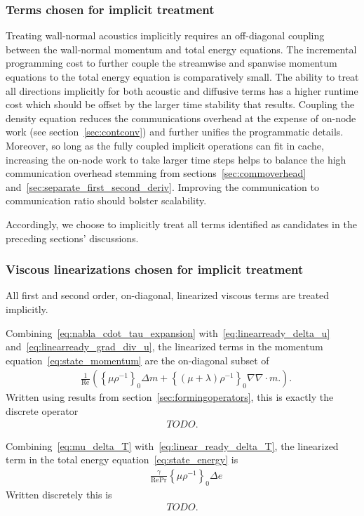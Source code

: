 \documentclass[letterpaper,11pt,nointlimits,reqno,draft]{amsart}
\newcommand{\Reynolds}[1][]{\ensuremath{\mbox{Re}_{#1}}}
\newcommand{\Prandtl}[1][]{\ensuremath{\mbox{Pr}_{#1}}}
\newcommand{\reference}[1]{\ensuremath{\left\{#1\right\}_{0}}}
\begin{document}
\subsubsection{Terms chosen for implicit treatment}

Treating wall-normal acoustics implicitly requires an off-diagonal coupling
between the wall-normal momentum and total energy equations.  The incremental
programming cost to further couple the streamwise and spanwise momentum
equations to the total energy equation is comparatively small.  The ability to
treat all directions implicitly for both acoustic and diffusive terms has a
higher runtime cost which should be offset by the larger time stability that
results.  Coupling the density equation reduces the communications overhead at
the expense of on-node work (see section~\ref{sec:contconv}) and further
unifies the programmatic details.  Moreover, so long as the fully coupled
implicit operations can fit in cache, increasing the on-node work to take
larger time steps helps to balance the high communication overhead stemming
from sections~\ref{sec:commoverhead} and~\ref{sec:separate_first_second_deriv}.
Improving the communication to communication ratio should bolster scalability.

Accordingly, we choose to implicitly treat all terms identified as candidates
in the preceding sections' discussions.


\subsubsection{Viscous linearizations chosen for implicit treatment}

All first and second order, on-diagonal, linearized viscous terms are treated
implicitly.

Combining~\eqref{eq:nabla_cdot_tau_expansion} with~\eqref{eq:linearready_delta_u}
and~\eqref{eq:linearready_grad_div_u}, the linearized terms in the momentum
equation~\eqref{eq:state_momentum} are the on-diagonal subset of
\begin{align}
  &\frac{1}{\Reynolds}
  \left(
  \reference{\mu\rho^{-1}} \Delta{}m
  +
  \reference{\left(\mu+\lambda\right)\rho^{-1}} \nabla\nabla\cdot{}m.
  \right).
\end{align}
Written using results from section~\eqref{sec:formingoperators}, this is
exactly the discrete operator
\begin{align}
TODO.
\end{align}

Combining~\eqref{eq:mu_delta_T} with~\eqref{eq:linear_ready_delta_T}, the linearized
term in the total energy equation~\eqref{eq:state_energy} is
\begin{align}
  &\frac{\gamma}{\Reynolds\Prandtl}
  \reference{\mu\rho^{-1}}\Delta{}e
\end{align}
Written discretely this is
\begin{align}
TODO.
\end{align}
\end{document}
